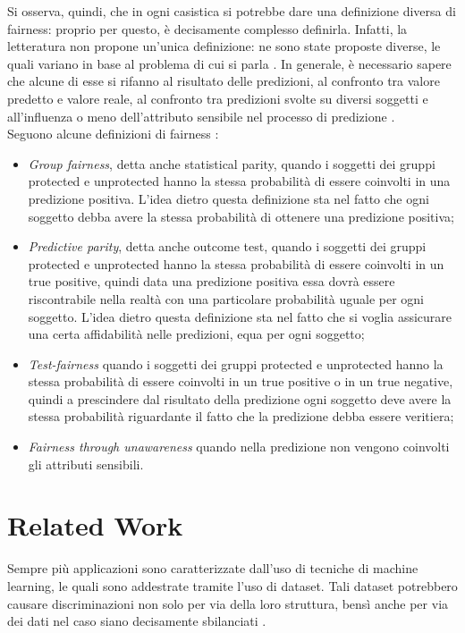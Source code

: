 Si osserva, quindi, che in ogni casistica si potrebbe dare una definizione diversa di fairness: proprio per questo, è decisamente complesso definirla. Infatti, la letteratura non propone un'unica definizione: ne sono state proposte diverse, le quali variano in base al problema di cui si parla \cite{islam2021through}. In generale, è necessario sapere che alcune di esse si rifanno al risultato delle predizioni, al confronto tra valore predetto e valore reale, al confronto tra predizioni svolte su diversi soggetti e all'influenza o meno dell'attributo sensibile nel processo di predizione \cite{verma2018fairness}.\\
Seguono alcune definizioni di fairness \cite{verma2018fairness}:
\begin{itemize}
  \item \emph{Group fairness}, detta anche statistical parity, quando i soggetti dei gruppi protected e unprotected hanno la stessa probabilità di essere coinvolti in una predizione positiva. L'idea dietro questa definizione sta nel fatto che ogni soggetto debba avere la stessa probabilità di ottenere una predizione positiva;
  \item \emph{Predictive parity}, detta anche outcome test, quando i soggetti dei gruppi protected e unprotected hanno la stessa probabilità di essere coinvolti in un true positive, quindi data una predizione positiva essa dovrà essere riscontrabile nella realtà con una particolare probabilità uguale per ogni soggetto. L'idea dietro questa definizione sta nel fatto che si voglia assicurare una certa affidabilità nelle predizioni, equa per ogni soggetto;
  \item \emph{Test-fairness} quando i soggetti dei gruppi protected e unprotected hanno la stessa probabilità di essere coinvolti in un true positive o in un true negative, quindi a prescindere dal risultato della predizione ogni soggetto deve avere la stessa probabilità riguardante il fatto che la predizione debba essere veritiera;
  \item \emph{Fairness through unawareness} quando nella predizione non vengono coinvolti gli attributi sensibili.
\end{itemize}

\section{Related Work}

Sempre più applicazioni sono caratterizzate dall'uso di tecniche di machine learning, le quali sono addestrate tramite l'uso di dataset. Tali dataset potrebbero causare discriminazioni non solo per via della loro struttura, bensì anche per via dei dati nel caso siano decisamente sbilanciati \cite{vasudevan2020lift}.

